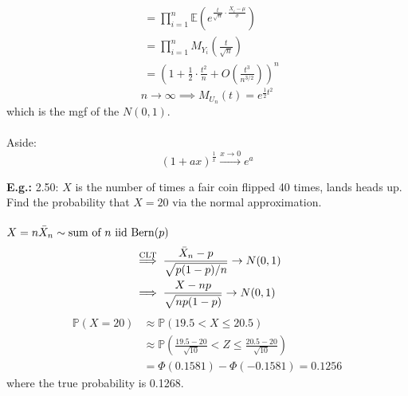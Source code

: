 \documentclass[a4paper]{article}
\newcommand{\n}{\hfill\break}
\newcommand{\eg}[1]{\par\noindent\settowidth{\hangindent}{\textbf{E.g.: }}\textbf{E.g.: }#1\n}
\newcommand{\Prob}{\mathbb{P}}
\renewcommand{\P}{\Prob}
\newcommand{\Avg}{\mathbb{E}}
\newcommand{\E}{\Avg}
\DeclareMathOperator{\Bern}{Bern}
\begin{document}
{\begin{align*}
        &=\prod_{i=1}^n\E\left(e^{\frac{t}{\sqrt{n}}\cdot\frac{X_i-\mu}{\sigma}}\right) \\
        &=\prod_{i=1}^n M_{Y_i}\left(\frac{t}{\sqrt{n}}\right) \\
        &=\left(1+\frac{1}{2}\cdot\frac{t^2}{n}+O\left(\frac{t^3}{n^{3/2}}\right)\right)^n
    \end{align*}
    \[n\rightarrow\infty\implies M_{U_n}(t)=e^{\frac{1}{2}t^2}\]
    which is the mgf of the $N(0,1)$.
    \\\\
    Aside: 
    \[(1+ax)^\frac{1}{x}\xrightarrow{x\rightarrow0}e^a\]
    
}

\eg{
    2.50: $X$ is the number of times a fair coin flipped 40 times, lands heads up. Find the probability that $X=20$ via the normal approximation.
    \\\\
    $X=n\Bar{X}_n\sim\text{sum of $n$ iid $\Bern(p)$}$
    \begin{align*}
        &\overset{\text{CLT}}{\implies} \frac{\Bar{X}_n-p}{\sqrt{p(1-p)/n}}\rightarrow N(0,1) \\
        &\implies \frac{X-np}{\sqrt{np(1-p)}}\rightarrow N(0,1)
    \end{align*}
    \begin{align*}
        \P(X=20)&\approx\P(19.5<X\leq20.5) \\
        &\approx\P\left(\frac{19.5-20}{\sqrt{10}}<Z\leq\frac{20.5-20}{\sqrt{10}}\right) \\
        &=\Phi(0.1581)-\Phi(-0.1581)=0.1256
    \end{align*}
    where the true probability is 0.1268.
}
\end{document}
